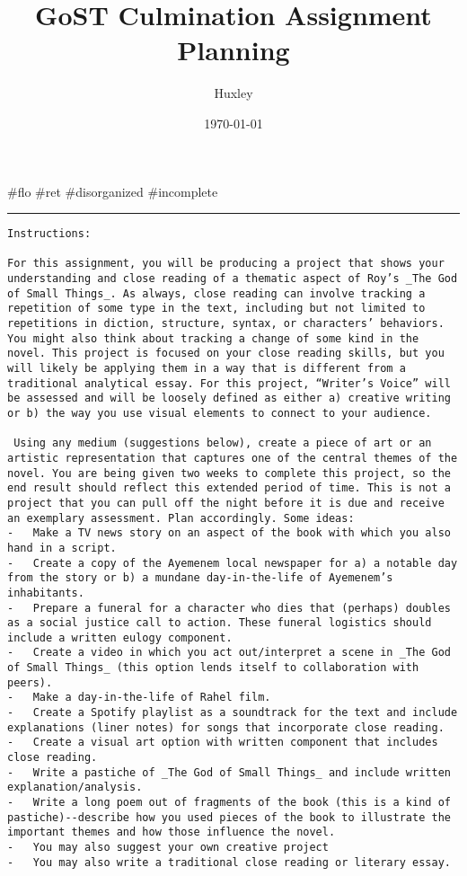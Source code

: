 \documentclass[letterpaper]{article}
\author{Huxley}
\date{\today}
\title{GoST Culmination Assignment Planning}
\renewcommand{\tableofcontents}{}
\begin{document}
\tableofcontents

\#flo \#ret \#disorganized \#incomplete

\noindent\rule{\textwidth}{0.5pt}

\begin{verbatim}
Instructions: 

For this assignment, you will be producing a project that shows your understanding and close reading of a thematic aspect of Roy’s _The God of Small Things_. As always, close reading can involve tracking a repetition of some type in the text, including but not limited to repetitions in diction, structure, syntax, or characters’ behaviors. You might also think about tracking a change of some kind in the novel. This project is focused on your close reading skills, but you will likely be applying them in a way that is different from a traditional analytical essay. For this project, “Writer’s Voice” will be assessed and will be loosely defined as either a) creative writing or b) the way you use visual elements to connect to your audience.

 Using any medium (suggestions below), create a piece of art or an artistic representation that captures one of the central themes of the novel. You are being given two weeks to complete this project, so the end result should reflect this extended period of time. This is not a project that you can pull off the night before it is due and receive an exemplary assessment. Plan accordingly. Some ideas: 
-   Make a TV news story on an aspect of the book with which you also hand in a script.
-   Create a copy of the Ayemenem local newspaper for a) a notable day from the story or b) a mundane day-in-the-life of Ayemenem’s inhabitants.
-   Prepare a funeral for a character who dies that (perhaps) doubles as a social justice call to action. These funeral logistics should include a written eulogy component.
-   Create a video in which you act out/interpret a scene in _The God of Small Things_ (this option lends itself to collaboration with peers).
-   Make a day-in-the-life of Rahel film.
-   Create a Spotify playlist as a soundtrack for the text and include explanations (liner notes) for songs that incorporate close reading.
-   Create a visual art option with written component that includes close reading.
-   Write a pastiche of _The God of Small Things_ and include written explanation/analysis.
-   Write a long poem out of fragments of the book (this is a kind of pastiche)--describe how you used pieces of the book to illustrate the important themes and how those influence the novel.
-   You may also suggest your own creative project
-   You may also write a traditional close reading or literary essay.


\end{verbatim}
\end{document}
